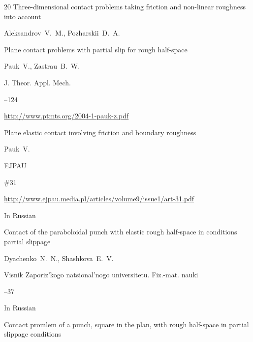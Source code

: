 \begin{thebibliography}{20}
\paper Three-dimensional contact problems taking friction and non-linear roughness into account

\by Aleksandrov~V.~M., Pozharskii~D.~A.


    




\paper Plane contact problems with partial slip for rough half-space

\by Pauk~V., Zastrau~B.~W.

\jour J. Theor. Appl. Mech.




--124

\elink \url{http://www.ptmts.org/2004-1-pauk-z.pdf}






\paper Plane elastic contact involving friction and boundary roughness

\by Pauk~V.

\jour EJPAU




\papernumber \#31

\elink \url{http://www.ejpau.media.pl/articles/volume9/issue1/art-31.pdf}






\lang In Russian

\paper Contact of the paraboloidal punch with elastic rough half-space in conditions partial slippage

\by Dyachenko~N.~N., Shashkova~E.~V.

\jour Visnik Zaporiz'kogo natsional'nogo universitetu. Fiz.-mat. nauki



--37






\lang In Russian

\paper Contact promlem of a punch, square in the plan, with rough half-space in partial slippage conditions


\end{thebibliography}
